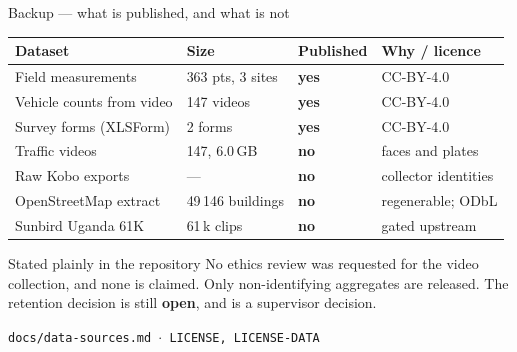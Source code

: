 \documentclass[aspectratio=169,10pt]{beamer}
\newcommand{\src}[1]{{\scriptsize\color{muted}\texttt{#1}}}
\newcommand{\up}[1]{\textcolor{good}{\textbf{#1}}}
\newcommand{\down}[1]{\textcolor{bad}{\textbf{#1}}}
\begin{document}
\begin{frame}{Backup --- what is published, and what is not}
  \scriptsize
  \begin{tabular}{@{}p{4.2cm}p{2.4cm}p{2.6cm}p{3.4cm}@{}}
    \toprule
    \textbf{Dataset} & \textbf{Size} & \textbf{Published} & \textbf{Why / licence} \\
    \midrule
    Field measurements & 363 pts, 3 sites & \up{yes} & CC-BY-4.0 \\
    Vehicle counts from video & 147 videos & \up{yes} & CC-BY-4.0 \\
    Survey forms (XLSForm) & 2 forms & \up{yes} & CC-BY-4.0 \\
    Traffic videos & 147, 6.0\,GB & \down{no} & faces and plates \\
    Raw Kobo exports & --- & \down{no} & collector identities \\
    OpenStreetMap extract & 49\,146 buildings & \down{no} & regenerable; ODbL \\
    Sunbird Uganda 61K & 61\,k clips & \down{no} & gated upstream \\
    \bottomrule
  \end{tabular}
  \vspace{.6em}

  \begin{alertblock}{Stated plainly in the repository}
    No ethics review was requested for the video collection, and none is
    claimed. Only non-identifying aggregates are released. The retention
    decision is still \textbf{open}, and is a supervisor decision.
  \end{alertblock}
  \src{docs/data-sources.md \; $\cdot$ \; LICENSE, LICENSE-DATA}
\end{frame}
\end{document}
